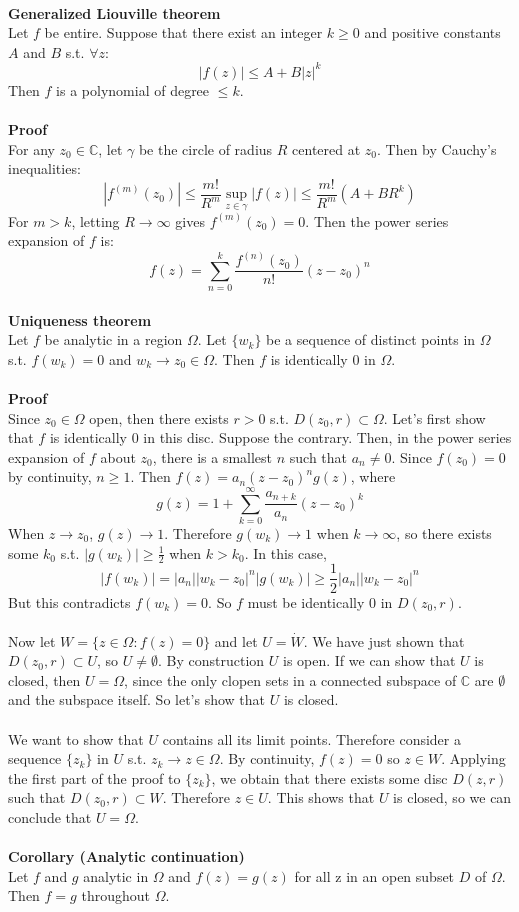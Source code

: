 \documentclass[12 pt]{article}
\begin{document}
\\
\textbf{Generalized Liouville theorem}
\\
Let $f$ be entire. Suppose that there exist an integer $k\geq 0$ and positive constants $A$ and $B$ s.t. $\forall z$:
\[ |f(z)| \leq A+B|z|^k \]
Then $f$ is a polynomial of degree $\leq k$.
\\
\\
\textbf{Proof}
\\
For any $z_0\in \mathbb{C}$, let $\gamma$ be the circle of radius $R$ centered at $z_0$. Then by Cauchy's inequalities:
\[ |f^{(m)} (z_0)| \leq \frac{m!}{R^m} \sup_{z\in \gamma} |f(z)| \leq \frac{m!}{R^m} (A+B R^k) \]
For $m>k$, letting $R\to \infty$ gives $f^{(m)}(z_0) = 0$. Then the power series expansion of $f$ is:
\[ f(z) = \sum_{n=0}^{k} \frac{f^{(n)}(z_0)}{n!} (z-z_0)^n \]
\\
\textbf{Uniqueness theorem}
\\
Let $f$ be analytic in a region $\Omega$. Let $\{w_k\}$ be a sequence of distinct points in $\Omega$ s.t. $f(w_k) = 0$ and $w_k\to z_0\in \Omega$. Then $f$ is identically 0 in $\Omega$.
\\
\\
\textbf{Proof}
\\
Since $z_0\in \Omega$ open, then there exists $r>0$ s.t. $D(z_0,r) \subset \Omega$. Let's first show that $f$ is identically 0 in this disc. Suppose the contrary. Then, in the power series expansion of $f$ about $z_0$, there is a smallest $n$ such that $a_n\neq 0$. Since $f(z_0)=0$ by continuity, $n\geq 1$. Then $f(z)=a_n (z-z_0)^n g(z)$, where
\[ g(z) = 1+ \sum_{k=0}^{\infty} \frac{a_{n+k}}{a_n} (z-z_0)^k \]
When $z\to z_0$, $g(z)\to 1$. Therefore $g(w_k)\to 1$ when $k\to \infty$, so there exists some $k_0$ s.t. $|g(w_k)|\geq \frac{1}{2}$ when $k>k_0$. In this case,
\[ |f(w_k)| = |a_n||w_k-z_0|^n|g(w_k)| \geq \frac{1}{2} |a_n||w_k-z_0|^n \]
But this contradicts $f(w_k) = 0$. So $f$ must be identically 0 in $D(z_0,r)$.
\\
\\
Now let $W = \{z\in \Omega : f(z) = 0\}$ and let $U = \dot W$. We have just shown that $D(z_0,r)\subset U$, so $U\neq \emptyset$. By construction $U$ is open. If we can show that $U$ is closed, then $U = \Omega$, since the only clopen sets in a connected subspace of $\mathbb{C}$ are $\emptyset$ and the subspace itself. So let's show that $U$ is closed.
\\
\\
We want to show that $U$ contains all its limit points. Therefore consider a sequence $\{z_k\}$ in $U$ s.t. $z_k\to z\in \Omega$. By continuity, $f(z)=0$ so $z\in W$. Applying the first part of the proof to $\{z_k\}$, we obtain that there exists some disc $D(z,r)$ such that $D(z_0,r) \subset W$. Therefore $z\in U$. This shows that $U$ is closed, so we can conclude that $U = \Omega$.
\\
\\
\textbf{Corollary (Analytic continuation)}
\\
Let $f$ and $g$ analytic in $\Omega$ and $f(z)=g(z)$ for all z in an open subset $D$ of $\Omega$. Then $f=g$ throughout $\Omega$.
\end{document}
